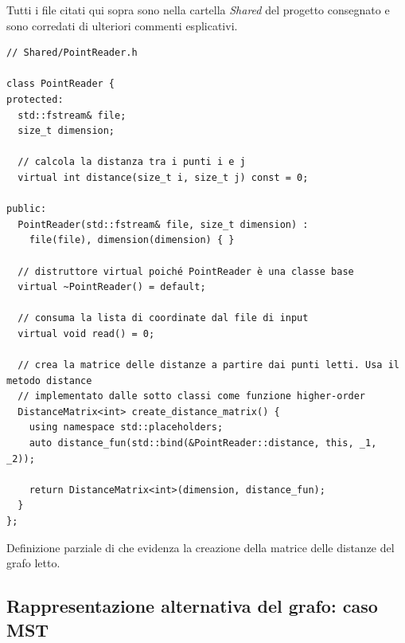 \noindent Tutti i file citati qui sopra sono nella cartella \textit{Shared} del progetto consegnato e sono corredati di ulteriori commenti esplicativi.

\begin{listing}[!ht]
\begin{verbatim}
// Shared/PointReader.h

class PointReader {
protected:
  std::fstream& file;
  size_t dimension;

  // calcola la distanza tra i punti i e j
  virtual int distance(size_t i, size_t j) const = 0;

public:
  PointReader(std::fstream& file, size_t dimension) :
    file(file), dimension(dimension) { }

  // distruttore virtual poiché PointReader è una classe base
  virtual ~PointReader() = default;

  // consuma la lista di coordinate dal file di input
  virtual void read() = 0;

  // crea la matrice delle distanze a partire dai punti letti. Usa il metodo distance
  // implementato dalle sotto classi come funzione higher-order
  DistanceMatrix<int> create_distance_matrix() {
    using namespace std::placeholders;
    auto distance_fun(std::bind(&PointReader::distance, this, _1, _2));

    return DistanceMatrix<int>(dimension, distance_fun);
  }
};
\end{verbatim}
\caption{Definizione parziale di  che evidenza la creazione della matrice delle distanze del grafo letto.}
\label{listing:point-reader}
\end{listing}



\subsection{Rappresentazione alternativa del grafo: caso MST}
\label{alternative-graph-representation}

